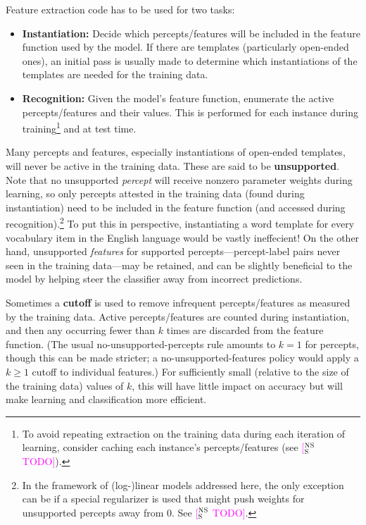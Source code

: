 \documentclass[11pt,letterpaper]{article}
\makeatletter
\newcommand{\ensuretext}[1]{#1}
\newcommand{\nssmarker}{\ensuretext{\textcolor{magenta}{\ensuremath{^{\textsc{NS}}_{\textsc{S}}}}}}
\newcommand{\arkcomment}[3]{\ensuretext{\textcolor{#3}{[#1 #2]}}}
\newcommand{\nss}[1]{\arkcomment{\nssmarker}{#1}{magenta}}
\renewcommand{\paragraph}{%
  \@startsection{paragraph}{4}%
  {\z@}{.2ex \@plus 1ex \@minus .2ex}{-1em}%
  {\normalfont\normalsize\bfseries}%
}
\makeatother
\begin{document}
Feature extraction code has to be used for two tasks:
\begin{itemize}
  \item \textbf{Instantiation:} 
  Decide which percepts\slash features will be included in the feature function used by the model. 
  If there are templates (particularly open-ended ones), an initial pass is usually made 
  to determine which instantiations of the templates are needed for the training data.
  \item \textbf{Recognition:} 
  Given the model's feature function, enumerate the active percepts\slash features and their values.
  This is performed for each instance during training\footnote{To avoid repeating extraction on the training data 
during each iteration of learning, consider caching each instance's percepts\slash features (see \nss{TODO}).} and at test time.
\end{itemize}

Many percepts and features, especially instantiations of open-ended templates, will never be active in the training data. 
These are said to be \textbf{unsupported}.
Note that no unsupported {\em percept} will receive nonzero parameter weights during learning, 
so only percepts attested in the training data (found during instantiation) 
need to be included in the feature function (and accessed during recognition).\footnote{In the framework of (log-)linear 
models addressed here, the only exception can be if a special regularizer is used that might push weights for unsupported percepts away from 0. 
See \nss{TODO}.}
To put this in perspective, instantiating a word template for every vocabulary item in the English language would be vastly ineffecient!
On the other hand, unsupported {\em features} for supported percepts---percept-label pairs never seen in the training data---may be retained, 
and can be slightly beneficial to the model by helping steer the classifier away from incorrect predictions. 

Sometimes a \textbf{cutoff} is used to remove infrequent percepts\slash features as measured by the training data.
Active percepts\slash features are counted during instantiation, and then any occurring fewer than $k$ times 
are discarded from the feature function. (The usual no-unsupported-percepts rule amounts to $k=1$ for percepts, 
though this can be made stricter; a no-unsupported-features policy would apply a $k\geq 1$ cutoff to individual features.)
For sufficiently small (relative to the size of the training data) values of $k$, 
this will have little impact on accuracy but will make learning and classification more efficient. 
\end{document}
